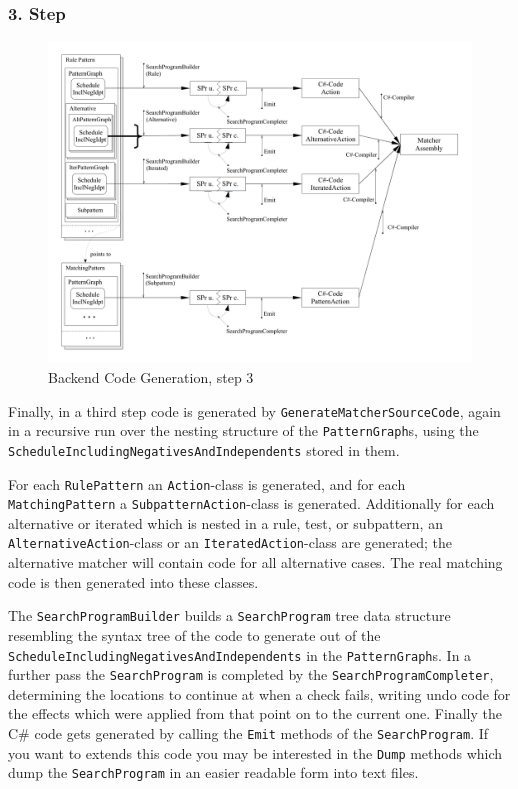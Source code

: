 \subsubsection*{3. Step}

\begin{figure}[htbp]
  \centering
  \includegraphics[width=\textwidth]{fig/AblaufCodeerzeugungBackend3}
  \caption{Backend Code Generation, step 3}
  \label{figbackendcodegen3}
\end{figure}

Finally, in a third step code is generated by \texttt{Generate\-Matcher\-Source\-Code},
again in a recursive run over the nesting structure of the \texttt{Pattern\-Graph}s, 
using the \texttt{Schedule\-Including\-Negatives\-And\-Independents} stored in them. 

For each \texttt{Rule\-Pattern} an \texttt{Action}-class is generated, 
and for each \texttt{Matching\-Pattern} a \texttt{Subpattern\-Action}-class is generated.
Additionally for each alternative or iterated which is nested in a rule, test, or subpattern,
an \texttt{Alternative\-Action}-class or an \texttt{Iterated\-Action}-class are generated;
the alternative matcher will contain code for all alternative cases.
The real matching code is then generated into these classes.

The \texttt{SearchProgramBuilder} builds a \texttt{SearchProgram} tree data structure resembling the syntax tree of the code to generate out of the \texttt{Schedule\-Including\-Negatives\-And\-Independents} in the \texttt{Pattern\-Graph}s. 
In a further pass the \texttt{SearchProgram} is completed by the \texttt{Search\-Program\-Completer},
determining the locations to continue at when a check fails,
writing undo code for the effects which were applied from that point on to the current one.
Finally the C\# code gets generated by calling the \texttt{Emit} methods of the \texttt{SearchProgram}.
If you want to extends this code you may be interested in the \texttt{Dump} methods which dump the \texttt{SearchProgram} in an easier readable form into text files.

